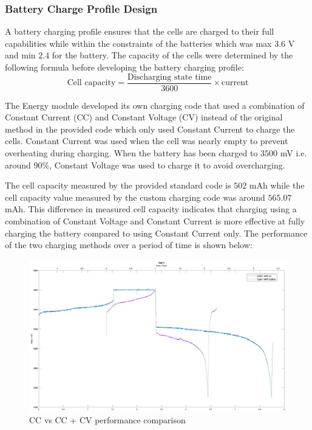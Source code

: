 \documentclass[11pt, a4paper]{article}
\begin{document}
\subsubsection{Battery Charge Profile Design}

A battery charging profile ensures that the cells are charged to their full capabilities while within the constraints of the batteries which was max $3.6$ V and min $2.4$ for the battery. The capacity of the cells were determined by the following formula before developing the battery charging profile:
$$
\text{Cell capacity} = \frac{\text{Discharging state time}}{3600} \times \text{current}
$$

The Energy module developed its own charging code that used a combination of Constant Current (CC) and Constant Voltage (CV) instead of the original method in the provided code which only used Constant Current to charge the cells. Constant Current was used when the cell was nearly empty to prevent overheating during charging\cite{Energy_constant_current}. When the battery has been charged to $3500$ mV i.e. around 90\%, Constant Voltage was used to charge it to avoid overcharging. 

The cell capacity measured by the provided standard code is $502$ mAh while the cell capacity value measured by the custom charging code was around $565.07$ mAh. This difference in measured cell capacity indicates that charging using a combination of Constant Voltage and Constant Current is more effective at fully charging the battery compared to using Constant Current only. The performance of the two charging methods over a period of time is shown below:
\begin{figure} [h!]
    \centering
    \includegraphics[scale=0.5]{CC and CV.JPG}
    \caption{CC vs CC + CV performance comparison}
\end{figure} 
\end{document}
